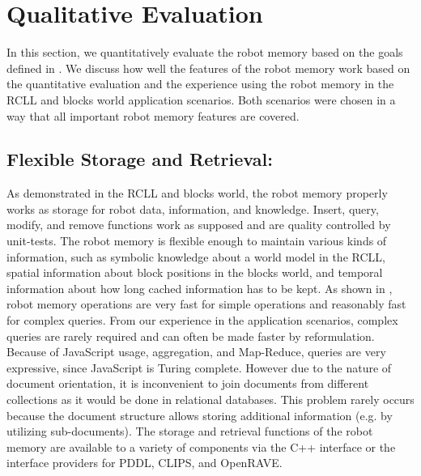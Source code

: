 \section{Qualitative Evaluation}
\label{sec:qualitative}
In this section, we quantitatively evaluate the robot memory based on
the goals defined in . We discuss how well the
features of the robot memory work based on the quantitative evaluation
and the experience using the robot memory in the RCLL and
blocks world application scenarios. Both scenarios were chosen in a
way that all important robot memory features are covered.

\subsection{Flexible Storage and Retrieval:}
As demonstrated in the RCLL and blocks world, the robot memory
properly works as storage for robot data, information,
and knowledge. Insert, query, modify, and remove functions work as
supposed and are quality controlled by unit-tests. The robot memory is flexible
enough to maintain various kinds of information, such as symbolic knowledge
about a world model in the RCLL, spatial information about block
positions in the blocks world, and temporal information about how long
cached information has to be kept. As shown in
, robot memory operations are very fast for
simple operations and reasonably fast for complex queries.
From our experience in the application scenarios, complex
queries are rarely required and can often be made faster by
reformulation.  Because of JavaScript usage, aggregation, and
Map-Reduce, queries are very expressive, since JavaScript is Turing
complete. However due to the nature of document orientation, it is
inconvenient to join documents from different collections as it would
be done in relational databases. This problem rarely occurs because
the document structure allows
storing additional information (e.g. by utilizing sub-documents).
The storage and retrieval functions of the robot memory are available
to a variety of components via the C++ interface or the interface
providers for PDDL, CLIPS, and OpenRAVE.

